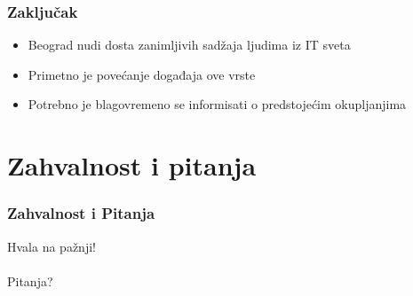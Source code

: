\documentclass[hyperref={bookmarks=false},aspectratio=169]{beamer}
\begin{document}
\begin{frame}
\frametitle{Zaključak}

\begin{itemize}
    \item Beograd nudi dosta zanimljivih sadžaja ljudima iz IT sveta
    \item Primetno je povećanje događaja ove vrste
    \item Potrebno je blagovremeno se informisati o predstojećim okupljanjima
\end{itemize}

\end{frame}

\section{Zahvalnost i pitanja}

\begin{frame}
\frametitle{Zahvalnost i Pitanja}

\begin{center}
\Huge{Hvala na pažnji!}
\\ \\
\LARGE{Pitanja?}
\end{center}

\end{frame}
\end{document}
